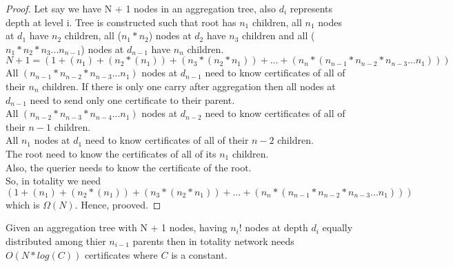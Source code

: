 \begin{proof}
	Let say we have N + 1 nodes in an aggregation tree, also $d_{i}$ represents depth at level i. Tree is constructed such that root has $n_{1}$ children, all $n_{1}$ nodes at $d_{1}$ have $n_{2}$ children, all ($n_{1} * n_{2}$)  nodes at $d_{2}$ have $n_{3}$ children and all ($n_{1} * n_{2} * n_{3} ... n_{n-1}$) nodes at $d_{n-1}$ have $n_{n}$ children.\\
	$ N + 1 = (1 + (n_{1}) + (n_{2} * (n_{1})) + (n_{3} * (n_{2} * n_{1})) + ... + (n_{n} * (n_{n-1} * n_{n-2} * n_{n-3} ... n_{1}) ) ) $\\
	
	All $ (n_{n-1} * n_{n-2} * n_{n-3} ... n_{1}) $ nodes at $ d_{n-1} $ need to know certificates of all of their $n_{n}$ children.
	If there is only one carry after aggregation then all nodes at $d_{n-1}$ need to send only one certificate to their parent.\\
	All $ (n_{n-2} * n_{n-3} * n_{n-4} ... n_{1}) $ nodes at $ d_{n-2} $ need to know certificates of all of their $ n-1 $ children.\\
	All $ n_{1} $ nodes at $ d_{1} $ need to know certificates of all of their $ n-2 $ children.\\
	The root need to know the certificates of all of its $ n_{1} $ children.\\
	Also, the querier needs to know the certificate of the root.\\
	So, in totality we need $ (1 + (n_{1}) + (n_{2} * (n_{1})) + (n_{3} * (n_{2} * n_{1})) + ... + (n_{n} * (n_{n-1} * n_{n-2} * n_{n-3} ... n_{1}) ) ) $ which is $\Omega(N)$. Hence, prooved.

\end{proof}

\begin{theorem}
	Given an aggregation tree with N + 1 nodes, having $n_{i}!$ nodes at depth $d_{i}$ equally distributed among thier $n_{i-1}$ parents then in totality network needs $O(N*log(C))$ certificates where $C$ is a constant.
\end{theorem}

